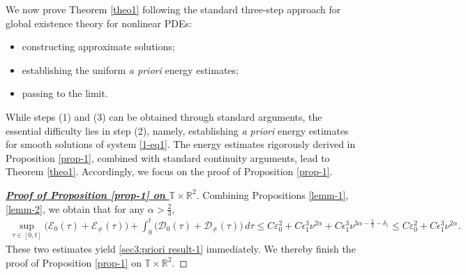 \documentclass[11pt,reqno]{article}
\numberwithin{equation}{section}
\newcommand\R{{\mathbb R}}
\newcommand\T{{\mathbb T}}
\newcommand\D{{\mathcal D}}
\newcommand\E{{\mathcal E}}
\let\al=\alpha
\let\var=\varepsilon
\let\f=\frac
\let\ep=\epsilon
\begin{document}
We now prove Theorem \ref{theo1} following the standard three-step approach for global existence theory for nonlinear PDEs:
\begin{itemize}
\item[(1)] constructing approximate solutions;
\item[(2)] establishing the uniform  \textit{a priori} energy estimates;
\item[(3)] passing to the limit.
\end{itemize}
While steps (1) and (3) can be obtained through standard arguments, the essential difficulty lies in step (2), namely, establishing \textit{a priori} energy estimates for smooth solutions of system \eqref{1-eq1}.
The energy estimates rigorously derived in Proposition \ref{prop-1}, combined with standard continuity arguments, lead to Theorem \ref{theo1}.
Accordingly, we focus on the proof of Proposition \ref{prop-1}.


\begin{proof}[\textbf{\underline{Proof of Proposition \ref{prop-1} on $\T\times\R^2$}}]
Combining Propositions \ref{lemm-1}, \ref{lemm-2}, we obtain that for any $\alpha>\f23$,
\begin{align*}
	\sup_{\tau\in[0,t]}\big(\E_0(\tau)+\E_{\not=}(\tau)\big)
	+\int_0^t\big(\D_0(\tau)+\D_{\not=}(\tau)\big)\,d\tau
	\leq  C\var_0^2+C\ep_1^3\nu^{2\al}+C\ep_1^3\nu^{3\alpha-\f23-\delta_1}
    \leq C\var_0^2+C\ep_1^3\nu^{2\al}.
\end{align*}
These two estimates yield \eqref{sec3:priori result-1} immediately.
We thereby finish the proof of Proposition \ref{prop-1} on $\T\times\R^2$.
\end{proof}
\end{document}
